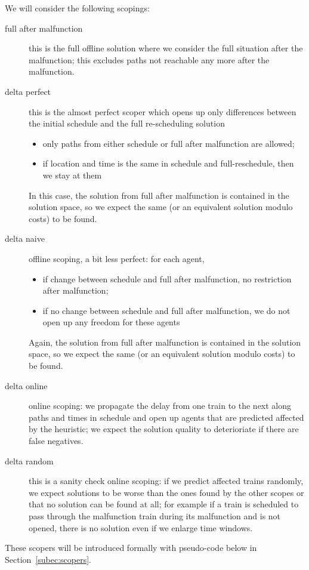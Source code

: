 \documentclass{article}
\begin{document}
We will consider the following scopings:
\begin{description}
\item[full after malfunction] this is the full offline solution where we consider the full situation after the malfunction; this excludes paths not reachable any more after the malfunction.
\item[delta perfect] this is the almost perfect scoper which opens up only differences between the initial schedule and the full re-scheduling solution
\begin{itemize}
    \item only paths from either schedule or full after malfunction are allowed;     
    \item if location and time is the same in schedule and full-reschedule, then we stay at them
\end{itemize}
In this case, the solution from full after malfunction is contained in the solution space, so we expect the same (or an equivalent solution modulo costs) to be found.
\item[delta naive] offline scoping, a bit less perfect: for each agent,
\begin{itemize}
    \item if change between schedule and full after malfunction, no restriction after malfunction;    \item if no change between schedule and full after malfunction, we do not open up any freedom for these agents
\end{itemize}
Again, the solution from full after malfunction is contained in the solution space, so we expect the same (or an equivalent solution modulo costs) to be found.
\item[delta online] online scoping: we propagate the delay from one train to the next along paths and times in schedule and open up agents that are predicted affected by the heuristic; we expect the solution quality to deterioriate if there are false negatives.
\item[delta random] this is a sanity check online scoping: if we predict affected trains randomly, we expect solutions to be worse than the ones found by the other scopes or that no solution can be found at all; for example if a train is scheduled to pass through the malfunction train during its malfunction and is not opened, there is no solution even if we enlarge time windows.
\end{description}
These scopers will be introduced formally with pseudo-code below in Section~\ref{subec:scopers}.
\end{document}
